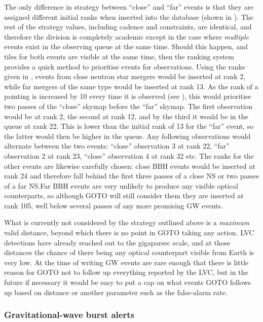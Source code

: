 \begin{colsection}
The only difference in strategy between ``close'' and ``far'' events is that they are assigned different initial ranks when inserted into the database (shown in ). The rest of the strategy values, including cadence and constraints, are identical, and therefore the division is completely academic except in the case where \emph{multiple} events exist in the observing queue at the same time. Should this happen, and tiles for both events are visible at the same time, then the ranking system provides a quick method to prioritise events for observations. Using the ranks given in , events from close neutron star mergers would be inserted at rank 2, while far mergers of the same type would be inserted at rank 13. As the rank of a pointing is increased by 10 every time it is observed (see ), this would prioritise two passes of the ``close'' skymap before the ``far'' skymap. The first observation would be at rank 2, the second at rank 12, and by the third it would be in the queue at rank 22. This is lower than the initial rank of 13 for the ``far'' event, so the latter would then be higher in the queue. Any following observations would alternate between the two events: ``close'' observation 3 at rank 22, ``far'' observation 2 at rank 23, ``close'' observation 4 at rank 32 etc. The ranks for the other events are likewise carefully chosen: close BBH events would be inserted at rank 24 and therefore fall behind the first three passes of a close NS or two passes of a far NS.\@ Far BBH events are very unlikely to produce any visible optical counterparts, so although GOTO will still consider them they are inserted at rank 105, well below several passes of any more promising GW events.

What is currently not considered by the strategy outlined above is a \textit{maximum} valid distance, beyond which there is no point in GOTO taking any action. LVC detections have already reached out to the gigaparsec scale, and at those distances the chance of there being any optical counterpart visible from Earth is very low. At the time of writing GW events are rare enough that there is little reason for GOTO not to follow up everything reported by the LVC, but in the future if necessary it would be easy to put a cap on what events GOTO follows up based on distance or another parameter such as the false-alarm rate.

\newpage

\subsubsection{Gravitational-wave burst alerts}


\end{colsection}
